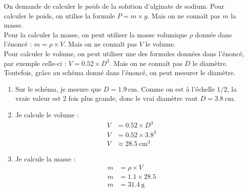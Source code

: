 \documentclass["../Cours.tex"]{subfiles}
\begin{document}
\clearpage
\CORRECTIONS
\begin{questions}
    \exercice On demande de calculer le \emph{poids} de la solution d'alginate de sodium. Pour calculer le poids, on utilise la formule $P= m \times g$. Mais on ne connaît pas $m$ la masse.\\
    Pour la calculer la masse, on peut utiliser la masse volumique $\rho$ donnée dans l'énoncé : $m = \rho \times V$. Mais on ne connaît pas $V$ le volume.\\
    Pour calculer le volume, on peut utiliser une des formules données dans l'énoncé, par exemple celle-ci : $V=\num{0.52} \times D^3$. Mais on ne connaît pas $D$ le diamètre.\\
    Toutefois, grâce au schéma donné dans l'énoncé, on peut mesurer le diamètre.\\


    \begin{enumerate}
        \item Sur le schéma, je mesure que $D=\qty{1.9}{\centi\metre}$. Comme on est à l'échelle $1/2$, la vraie valeur est 2 fois plus grande, donc le vrai diamètre vaut $D=\qty{3.8}{\centi\metre}$.

        \item Je calcule le volume :
        \begin{align*}
            V &= \num{0.52} \times D^3 \\ 
            V &= \num{0.52} \times \num{3.8}^3 \\ 
            V &\approx \qty{28.5}{\centi\metre\cubed}
        \end{align*}

        \item Je calcule la masse : 
        \begin{align*}
            m &= \rho \times V \\ 
            m &= \num{1.1} \times \num{28.5} \\
            m &= \qty{31.4}{\gram}
        \end{align*}


\end{enumerate}
\end{questions}
\end{document}
